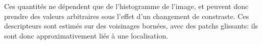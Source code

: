 \documentclass{article}
\begin{document}
Ces quantités ne dépendent que de l'histogramme de l'image, et peuvent donc
prendre des valeurs arbitraires sous l'effet d'un changement de constraste.
Ces descripteurs  sont estimés sur des voisinages bornées, avec des patchs
glissants: ils sont donc approximativement liés à une localisation.


\end{document}
